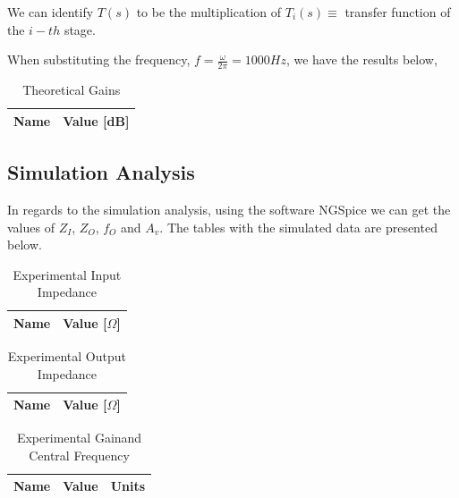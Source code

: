 We can identify $T(s)$ to be the multiplication of $T_i(s)\equiv$ transfer function of the $i-th$ stage. 

When substituting the frequency, $f=\frac{\omega}{2\pi}= 1000 Hz$, we have the results below,

\begin{table}[h]
    \centering
    \begin{tabular}{|l|c|}
    \hline
    {\bf Name} & {\bf Value [dB]} \\ \hline
    
   \end{tabular}
   \caption{Theoretical Gains}
   \label{tab:theo_gain}
\end{table}

\pagebreak

\subsection{Simulation Analysis}
\label{subsec:sim_analysis}

In regards to the simulation analysis, using the software NGSpice we can get the values of $Z_I$, $Z_O$, $f_O$ and $A_v$.
The tables with the simulated data are presented below.

\begin{table}[h]
    \centering
    \begin{tabular}{|l|c|}
    \hline
    {\bf Name} & {\bf Value [$\Omega$]} \\ \hline
    
    \end{tabular}
   \caption{Experimental Input Impedance}
   \label{tab:exp_in_imp}
\end{table}
\begin{table}[h]
    \centering
    \begin{tabular}{|l|c|}
    \hline
    {\bf Name} & {\bf Value [$\Omega$]} \\ \hline
    
    \end{tabular}
   \caption{Experimental Output Impedance}
   \label{tab:exp_out_imp}
\end{table}
\begin{table}[h]
    \centering
    \begin{tabular}{|l|c|c|}
    \hline
    {\bf Name} & {\bf Value} & {\bf Units}\\ \hline
    
    \end{tabular}
   \caption[Experimental Gain and Central Frequency]{Experimental Gain\footnotemark and Central Frequency}
   \label{tab:exp_gain_freq}
\end{table}

